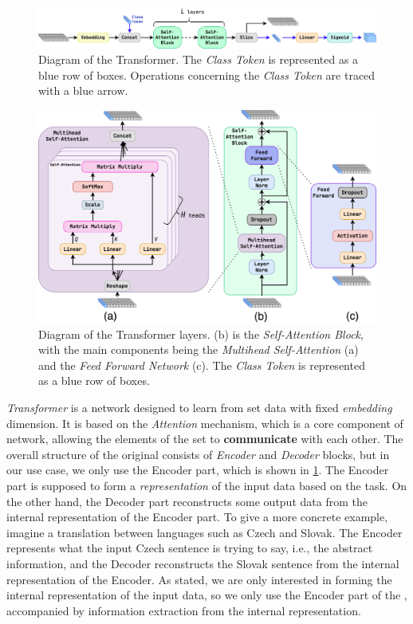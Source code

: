 \begin{figure}[htb]
    \centering
    \includegraphics[width=1.\linewidth]{src/diagrams/transformer.png}
    \caption{Diagram of the Transformer. The \emph{Class Token} is represented as a blue row of boxes. Operations concerning the \emph{Class Token} are traced with a blue arrow.}
    \label{fig:trans}
\end{figure}

\begin{figure}[htb]
    \centering
    \includegraphics[width=0.9\linewidth]{src/diagrams/transformer_layers.png}
    \caption{Diagram of the Transformer layers. (b) is the \emph{Self-Attention Block}, with the main components being the \emph{Multihead Self-Attention} (a) and the \emph{Feed Forward Network} (c). The \emph{Class Token} is represented as a blue row of boxes.}
    \label{fig:trans_layers}
\end{figure}

\emph{Transformer} \cite{att_is_all} is a network designed to learn from set data with fixed \emph{embedding} dimension.
It is based on the \emph{Attention} mechanism, which is a core component of \trans network, allowing the elements of the set to \textbf{communicate} with each other.
The overall structure of the original \trans consists of \emph{Encoder} and \emph{Decoder} blocks, but in our use case, we only use the Encoder part, which is shown in \cref{fig:trans}.
The Encoder part is supposed to form a \emph{representation} of the input data based on the task.
On the other hand, the Decoder part reconstructs some output data from the internal representation of the Encoder part.
To give a more concrete example, imagine a translation between languages such as Czech and Slovak.
The Encoder represents what the input Czech sentence is trying to say, i.e., the abstract information, and the Decoder reconstructs the Slovak sentence from the internal representation of the Encoder.
As stated, we are only interested in forming the internal representation of the input data, so we only use the Encoder part of the \trans, accompanied by information extraction from the internal representation.


